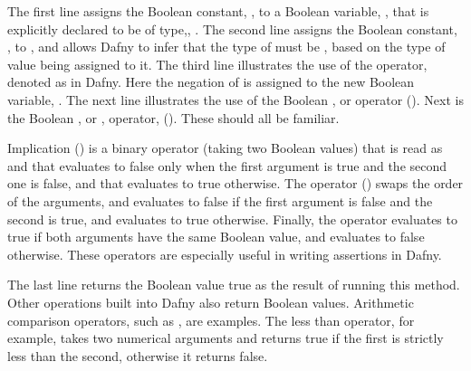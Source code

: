 \documentclass[letterpaper,10pt,english]{sphinxmanual}
\begin{document}
The first line assigns the Boolean constant, , to a Boolean
variable, , that is explicitly declared to be of type,, .
The second line assigns the Boolean constant, , to , and
allows Dafny to infer that the type of  must be , based on
the type of value being assigned to it. The third line illustrates the
use of the  operator, denoted as \sphinxstyleemphasis{!} in Dafny. Here the
negation of  is assigned to the new Boolean variable, . The
next line illustrates the use of the Boolean , or 
operator (\sphinxstyleemphasis{\&\&}). Next is the Boolean , or , operator,
(\sphinxstyleemphasis{\textbar{}\textbar{}}). These should all be familiar.

Implication (\sphinxstyleemphasis{==\textgreater{}}) is a binary operator (taking two Boolean values)
that is read as  and that evaluates to false only when the
first argument is true and the second one is false, and that evaluates
to true otherwise. The  operator (\sphinxstyleemphasis{\textless{}==}) swaps the order of
the arguments, and evaluates to false if the first argument is false
and the second is true, and evaluates to true otherwise. Finally, the
 operator evaluates to true if both arguments have the
same Boolean value, and evaluates to false otherwise. These operators
are especially useful in writing assertions in Dafny.

The last line returns the Boolean value true as the result of running
this method. Other operations built into Dafny also return Boolean
values.  Arithmetic comparison operators, such as \sphinxstyleemphasis{\textless{}}, are examples.
The less than operator, for example, takes two numerical arguments and
returns true if the first is strictly less than the second, otherwise
it returns false.
\end{document}
